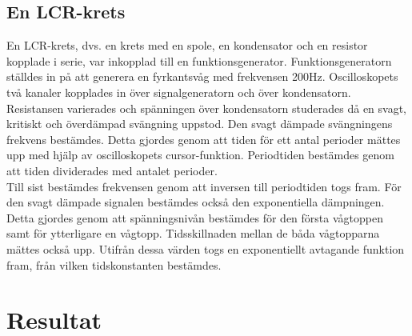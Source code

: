 \documentclass[a4paper,10pt]{article}
\begin{document}
\subsection{En LCR-krets}
En LCR-krets, dvs. en krets med en spole, en kondensator och en resistor kopplade i serie, var inkopplad till en funktionsgenerator. Funktionsgeneratorn ställdes in på att generera en fyrkantsvåg med frekvensen 200Hz. Oscilloskopets två kanaler kopplades in över signalgeneratorn och över kondensatorn.\\
\indent Resistansen varierades och spänningen över kondensatorn studerades då en svagt, kritiskt och överdämpad svängning uppstod. Den svagt dämpade svängningens frekvens bestämdes. Detta gjordes genom att tiden för ett antal perioder mättes upp med hjälp av oscilloskopets cursor-funktion. Periodtiden bestämdes genom att tiden dividerades med antalet perioder.\\
\indent Till sist bestämdes frekvensen genom att inversen till periodtiden togs fram. För den svagt dämpade signalen bestämdes också den exponentiella dämpningen. Detta gjordes genom att spänningsnivån bestämdes för den första vågtoppen samt för ytterligare en vågtopp. Tidsskillnaden mellan de båda vågtopparna mättes också upp. Utifrån dessa värden togs en exponentiellt avtagande funktion fram, från vilken tidskonstanten bestämdes.

\section{Resultat}
\end{document}
